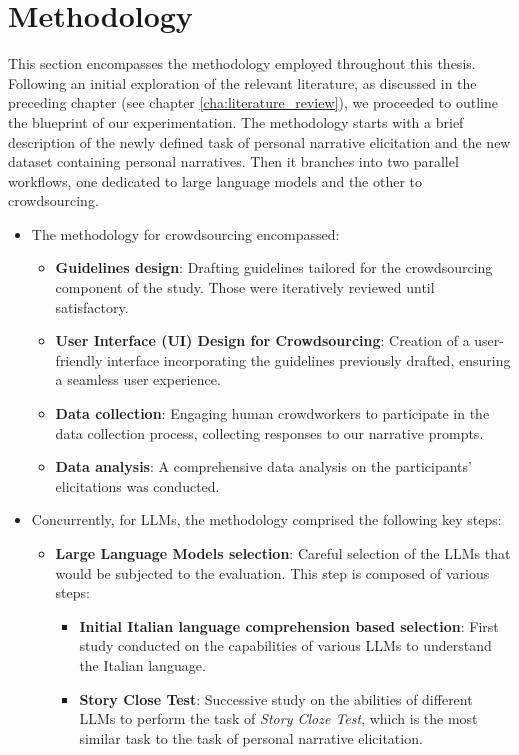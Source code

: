 \chapter{Methodology}
\label{cha:methodology}
This section encompasses the methodology employed throughout this thesis. Following an initial exploration of the relevant literature, as discussed in the preceding chapter (see chapter \ref{cha:literature_review}), we proceeded to outline the blueprint of our experimentation. The methodology starts with a brief description of the newly defined task of personal narrative elicitation and the new dataset containing personal narratives. Then it branches into two parallel workflows, one dedicated to large language models and the other to crowdsourcing. 
\begin{itemize}
    \item The methodology for crowdsourcing encompassed:
        \begin{itemize}
            \item \textbf{Guidelines design}: Drafting guidelines tailored for the crowdsourcing component of the study. Those were iteratively reviewed until satisfactory.
            \item \textbf{User Interface (UI) Design for Crowdsourcing}: Creation of a user-friendly interface incorporating the guidelines previously drafted, ensuring a seamless user experience.
            \item \textbf{Data collection}: Engaging human crowdworkers to participate in the data collection process, collecting responses to our narrative prompts.
            \item \textbf{Data analysis}: A comprehensive data analysis on the participants' elicitations was conducted.
        \end{itemize}
    \item Concurrently, for LLMs, the methodology comprised the following key steps:
        \begin{itemize}
            \item \textbf{Large Language Models selection}: Careful selection of the LLMs that would be subjected to the evaluation. This step is composed of various steps:
            \begin{itemize}
                \item \textbf{Initial Italian language comprehension based selection}: First study conducted on the capabilities of various LLMs to understand the Italian language.
                \item \textbf{Story Close Test}: Successive study on the abilities of different LLMs to perform the task of \emph{Story Cloze Test}, which is the most similar task to the task of personal narrative elicitation.

\end{itemize}
\end{itemize}
\end{itemize}
